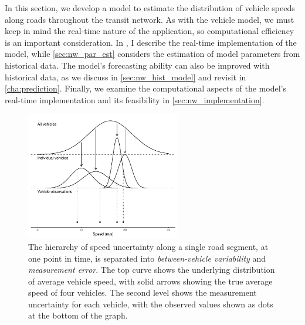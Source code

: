 In this section, we develop a model to estimate the distribution of vehicle speeds along roads throughout the transit network. As with the vehicle model, we must keep in mind the real-time nature of the application, so computational efficiency is an important consideration. In , I describe the real-time implementation of the model, while \cref{sec:nw_par_est} considers the estimation of model parameters from historical data. The model's forecasting ability can also be improved with historical data, as we discuss in \cref{sec:nw_hist_model} and revisit in \cref{cha:prediction}. Finally, we examine the computational aspects of the model's real-time implementation and its feasibility in \cref{sec:nw_implementation}.


\begin{knitrout}\small
{}\color{fgcolor}\begin{figure}

{\centering \includegraphics[width=0.6\textwidth]{figure/nw_model_hierarchy-1} 

}

\caption[The hierarchy of speed uncertainty along a single road segment, at one point in time, is separated into \emph{between-vehicle variability} and \emph{measurement error}]{The hierarchy of speed uncertainty along a single road segment, at one point in time, is separated into \emph{between-vehicle variability} and \emph{measurement error}. The top curve shows the underlying distribution of average vehicle speed, with solid arrows showing the true average speed of four vehicles. The second level shows the measurement uncertainty for each vehicle, with the observed values shown as dots at the bottom of the graph.}\label{fig:nw_model_hierarchy}
\end{figure}


\end{knitrout}






